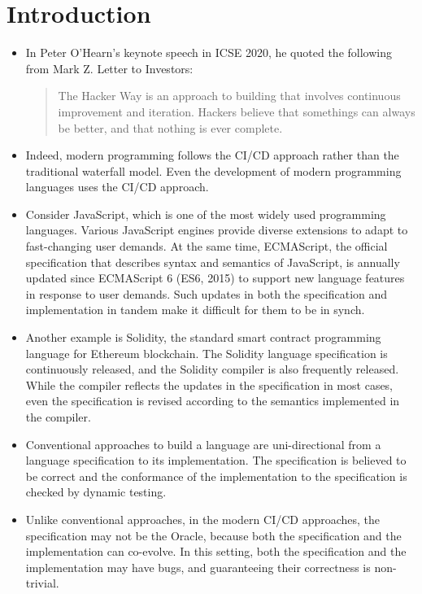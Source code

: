 \section{Introduction}\label{sec:intro}
\begin{itemize}
\item In Peter O'Hearn's keynote speech in ICSE 2020, he quoted the
following from Mark Z. Letter to Investors:
\begin{quote}
The Hacker Way is an approach to building that involves continuous
improvement and iteration.
Hackers believe that somethings can always be better, and that nothing
is ever complete.
\end{quote}

\item Indeed, modern programming follows the CI/CD approach rather than the
traditional waterfall model.
Even the development of modern programming languages uses the CI/CD approach.

\item Consider JavaScript, which is one of the most widely used
programming languages.  Various JavaScript engines provide diverse
extensions to adapt to fast-changing user demands.
At the same time, ECMAScript, the official specification that
describes syntax and semantics of JavaScript, is annually updated since
ECMAScript 6 (ES6, 2015) to support new language features in response
to user demands.  Such updates in both the specification and
implementation in tandem make it difficult for them to be in synch.

\item Another example is Solidity, the standard smart
contract programming language for Ethereum blockchain. The Solidity
language specification is continuously released, and the Solidity
compiler is also frequently released. While the compiler reflects
the updates in the specification in most cases, even the specification
is revised according to the semantics implemented in the compiler.

\item Conventional approaches to build a language are uni-directional
  from a language specification to its implementation. The
  specification is believed to be correct and the conformance of the
  implementation to the specification is checked by dynamic testing.

\item Unlike conventional approaches, in the modern CI/CD approaches,
the specification may not be the Oracle, because both the
specification and the implementation can co-evolve. In this setting, both
the specification and the implementation may have bugs, and
guaranteeing their correctness is non-trivial.


\end{itemize}
